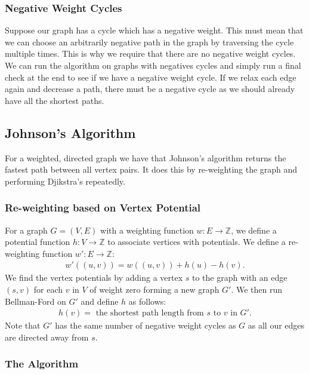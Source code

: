 \subsubsection{Negative Weight Cycles}

Suppose our graph has a cycle which has a negative weight. 
This must mean that we can choose an arbitrarily negative 
path in the graph by traversing the cycle multiple times.
This is why we require that there are no negative weight cycles.
\\[\baselineskip]
We can run the algorithm on graphs with negatives cycles and
simply run a final check at the end to see if we have a negative weight cycle.
If we relax each edge again and decrease a path, there must be a negative cycle
as we should already have all the shortest paths.

\newpage

\subsection{Johnson's Algorithm}

For a weighted, directed graph we have that Johnson's algorithm 
returns the fastest path between all vertex pairs. It does this 
by re-weighting the graph and performing Djikstra's
repeatedly.

\subsubsection{Re-weighting based on Vertex Potential}

For a graph $G = (V, E)$ with a weighting function $w : E \to \mathbb{Z}$, 
we define a potential function $h : V \to \mathbb{Z}$ to associate vertices with 
potentials. We define a re-weighting function $w' : E \to \mathbb{Z}$: \begin{gather*}
  w'((u, v)) = w((u, v)) + h(u) - h(v).
\end{gather*} We find the vertex potentials by adding a vertex $s$ to the graph with
an edge $(s, v)$ for each $v$ in $V$ of weight zero forming a new graph $G'$. 
We then run Bellman-Ford on $G'$ and define $h$ as follows: \begin{gather*}
  h(v) = \text{ the shortest path length from $s$ to $v$ in } G'.
\end{gather*} Note that $G'$ has the same number of negative weight cycles as $G$
as all our edges are directed away from $s$.

\subsubsection{The Algorithm}

